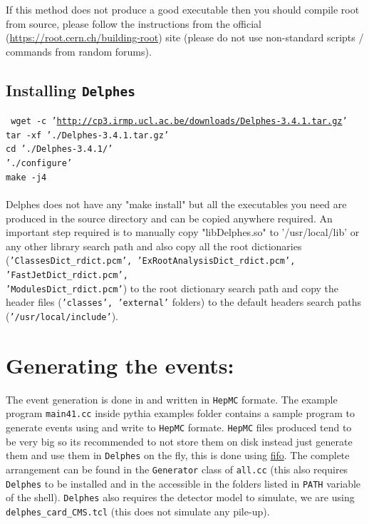 If this method does not produce a good executable then you should compile root from source, please follow the instructions from the official (\url{https://root.cern.ch/building-root}) site (please do not use non-standard scripts / commands from random forums).

\subsection{Installing {\tt Delphes}}
{\tt
	wget -c '\url{http://cp3.irmp.ucl.ac.be/downloads/Delphes-3.4.1.tar.gz}'\\
	tar -xf './Delphes-3.4.1.tar.gz'\\
	cd './Delphes-3.4.1/'\\
	'./configure'\\
	make -j4\\	
}\\
Delphes does not have any "make install" but all the executables you need are produced in the source directory and can be copied anywhere required.
An important step required is to manually copy "libDelphes.so" to '/usr/local/lib' or any other library search path and also copy all the root dictionaries
({\tt 'ClassesDict\_rdict.pcm', 'ExRootAnalysisDict\_rdict.pcm', 'FastJetDict\_rdict.pcm',\\ 'ModulesDict\_rdict.pcm'}) to the root dictionary search path and copy the header files ({\tt 'classes', 'external'} folders) to the default headers search paths ({\tt '/usr/local/include'}).

\section{Generating the events:}
The event generation is done in {\pyth} and written in {\tt HepMC} formate.
The example program {\tt main41.cc} inside pythia examples folder contains a sample program to generate events using {\pyth} and write to {\tt HepMC} formate.
{\tt HepMC} files produced tend to be very big so its recommended to not store them on disk instead just generate them and use them in {\tt Delphes} on the fly, this is done using \href{http://man7.org/linux/man-pages/man7/fifo.7.html}{fifo}.
The complete arrangement can be found in the {\tt Generator} class of {\tt all.cc} (this also requires {\tt Delphes} to be installed and in the accessible in the folders listed in {\tt PATH} variable of the shell). {\tt Delphes} also requires the detector model to simulate, we are using  {\tt delphes\_card\_CMS.tcl} (this does not simulate any pile-up).


